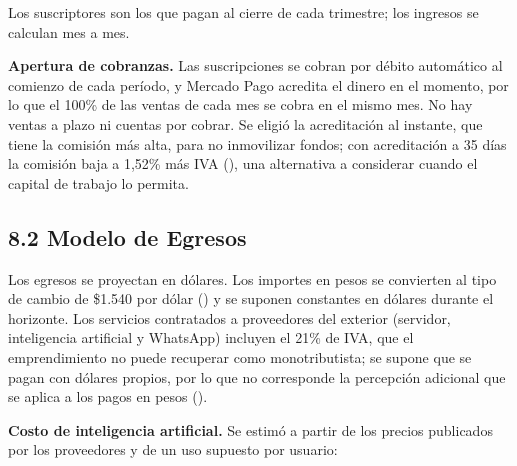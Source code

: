 Los suscriptores son los que pagan al cierre de cada trimestre; los
ingresos se calculan mes a mes.

\textbf{Apertura de cobranzas.} Las suscripciones se cobran por débito
automático al comienzo de cada período, y Mercado Pago acredita el
dinero en el momento, por lo que el 100\% de las ventas de cada mes se
cobra en el mismo mes. No hay ventas a plazo ni cuentas por cobrar. Se
eligió la acreditación al instante, que tiene la comisión más alta, para
no inmovilizar fondos; con acreditación a 35 días la comisión baja a
1,52\% más IVA (), una alternativa a considerar cuando el capital de trabajo lo
permita.

\subsection*{8.2 Modelo de Egresos}\label{modelo-de-egresos}

Los egresos se proyectan en dólares. Los importes en pesos se convierten
al tipo de cambio de \$1.540 por dólar
() y se suponen
constantes en dólares durante el horizonte. Los servicios contratados a
proveedores del exterior (servidor, inteligencia artificial y WhatsApp)
incluyen el 21\% de IVA, que el emprendimiento no puede recuperar como
monotributista; se supone que se pagan con dólares propios, por lo que
no corresponde la percepción adicional que se aplica a los pagos en
pesos ().

\textbf{Costo de inteligencia artificial.} Se estimó a partir de los
precios publicados por los proveedores y de un uso supuesto por usuario:

